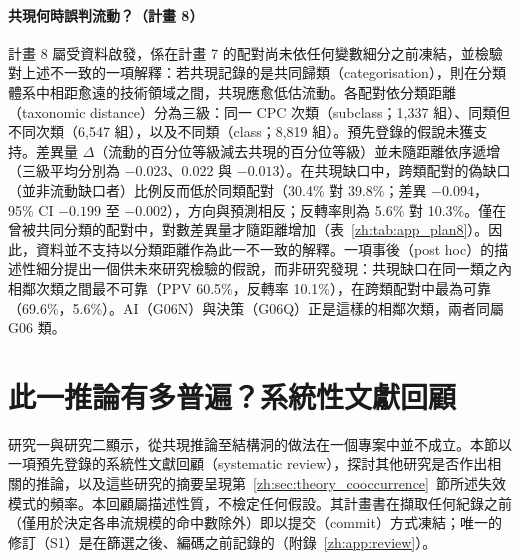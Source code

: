 \paragraph{共現何時誤判流動？（計畫 8）} 計畫 8 屬受資料啟發，係在計畫 7 的配對尚未依任何變數細分之前凍結，並檢驗對上述不一致的一項解釋：若共現記錄的是共同歸類（categorisation），則在分類體系中相距愈遠的技術領域之間，共現應愈低估流動。各配對依分類距離（taxonomic distance）分為三級：同一 CPC 次類（subclass；1,337 組）、同類但不同次類（6,547 組），以及不同類（class；8,819 組）。預先登錄的假說未獲支持。差異量 $\Delta$（流動的百分位等級減去共現的百分位等級）並未隨距離依序遞增（三級平均分別為 $-0.023$、$0.022$ 與 $-0.013$）。在共現缺口中，跨類配對的偽缺口（並非流動缺口者）比例反而低於同類配對（30.4\% 對 39.8\%；差異 $-0.094$，95\% CI $-0.199$ 至 $-0.002$），方向與預測相反；反轉率則為 5.6\% 對 10.3\%。僅在曾被共同分類的配對中，對數差異量才隨距離增加（表~\ref{zh:tab:app_plan8}）。因此，資料並不支持以分類距離作為此一不一致的解釋。一項事後（post hoc）的描述性細分提出一個供未來研究檢驗的假說，而非研究發現：共現缺口在同一類之內相鄰次類之間最不可靠（PPV 60.5\%，反轉率 10.1\%），在跨類配對中最為可靠（69.6\%，5.6\%）。AI（G06N）與決策（G06Q）正是這樣的相鄰次類，兩者同屬 G06 類。

\section{此一推論有多普遍？系統性文獻回顧}
\label{zh:sec:review}

研究一與研究二顯示，從共現推論至結構洞的做法在一個專案中並不成立。本節以一項預先登錄的系統性文獻回顧（systematic review），探討其他研究是否作出相關的推論，以及這些研究的摘要呈現第~\ref{zh:sec:theory_cooccurrence}~節所述失效模式的頻率。本回顧屬描述性質，不檢定任何假設。其計畫書在擷取任何紀錄之前（僅用於決定各串流規模的命中數除外）即以提交（commit）方式凍結；唯一的修訂（S1）是在篩選之後、編碼之前記錄的（附錄~\ref{zh:app:review}）。

